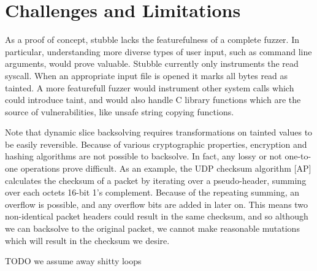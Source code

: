 \documentclass[11pt,expanded,copyright]{fsuthesis}
\begin{document}
\section{Challenges and Limitations}


As a proof of concept, stubble lacks the featurefulness of a complete fuzzer. In particular, understanding more diverse types of user input, such as command line arguments, would prove valuable. Stubble currently only instruments the read syscall. When an appropriate input file is opened it marks all bytes read as tainted. A more featurefull fuzzer would instrument other system calls which could introduce taint, and would also handle C library functions which are the source of vulnerabilities, like unsafe string copying functions.

Note that dynamic slice backsolving requires transformations on tainted values to be easily reversible. Because of various cryptographic properties, encryption and hashing algorithms are not possible to backsolve. In fact, any lossy or not one-to-one operations prove difficult. As an example, the UDP checksum algorithm [AP] calculates the checksum of a packet by iterating over a pseudo-header, summing over each octets 16-bit 1's complement. Because of the repeating summing, an overflow is possible, and any overflow bits are added in later on. This means two non-identical packet headers could result in the same checksum, and so although we can backsolve to the original packet, we cannot make reasonable mutations which will result in the checksum we desire.

TODO we assume away shitty loops



\end{document}
